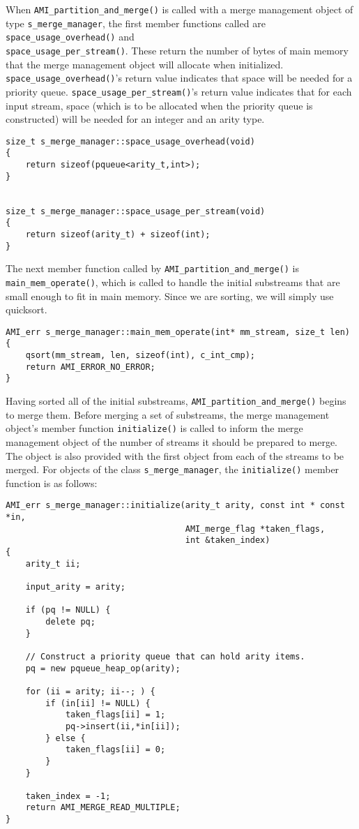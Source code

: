When \verb|AMI_partition_and_merge()| is called with a merge management
object of type \verb|s_merge_manager|, the first member functions called
are \verb|space_usage_overhead()| and\\ %
\verb|space_usage_per_stream()|.  These return the number of bytes of main
memory that the merge management object will allocate when initialized.
\verb|space_usage_overhead()|'s return value indicates that space will be
needed for a priority queue.  \verb|space_usage_per_stream()|'s return
value indicates that for each input stream, space (which is to be allocated
when the priority queue is constructed) will be needed for an integer and
an arity type.

\begin{verbatim}
size_t s_merge_manager::space_usage_overhead(void)
{
    return sizeof(pqueue<arity_t,int>);
}


size_t s_merge_manager::space_usage_per_stream(void)
{
    return sizeof(arity_t) + sizeof(int);
}
\end{verbatim}

The next member function called by \verb|AMI_partition_and_merge()| is
\verb|main_mem_operate()|, which is called to handle the initial
substreams that are small enough to fit in main
memory.  Since we are sorting, we will simply use
quicksort.

\begin{verbatim}
AMI_err s_merge_manager::main_mem_operate(int* mm_stream, size_t len)
{
    qsort(mm_stream, len, sizeof(int), c_int_cmp);
    return AMI_ERROR_NO_ERROR;
}
\end{verbatim}

Having sorted all of the initial substreams,
\verb|AMI_partition_and_merge()| begins to merge them.  Before merging a
set of substreams, the merge management object's member function
\verb|initialize()| is called to inform the merge management object of the
number of streams it should be prepared to merge.  The object is also
provided with the first object from each of the streams to be merged.  For
objects of the class \verb|s_merge_manager|, the \verb|initialize()| member
function is as follows:

\begin{verbatim}
AMI_err s_merge_manager::initialize(arity_t arity, const int * const *in,
                                    AMI_merge_flag *taken_flags,
                                    int &taken_index)
{
    arity_t ii;

    input_arity = arity;

    if (pq != NULL) {
        delete pq;
    }

    // Construct a priority queue that can hold arity items.
    pq = new pqueue_heap_op(arity);

    for (ii = arity; ii--; ) {
        if (in[ii] != NULL) {
            taken_flags[ii] = 1;
            pq->insert(ii,*in[ii]);
        } else {
            taken_flags[ii] = 0;
        }
    }

    taken_index = -1;
    return AMI_MERGE_READ_MULTIPLE;
}
\end{verbatim}

